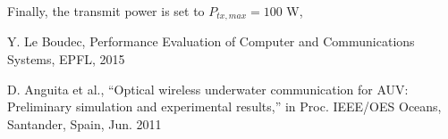 \documentclass[10pt]{article}
\begin{document}
Finally, the transmit power is set to $P_{tx, max} = 100$ W, 



\begin{thebibliography}{10}

Y. Le Boudec, Performance Evaluation of Computer and Communications Systems, EPFL, 2015

D. Anguita et al., “Optical wireless underwater communication for AUV: Preliminary simulation and experimental results,” in Proc. IEEE/OES Oceans, Santander, Spain, Jun. 2011

\end{thebibliography}
\end{document}
